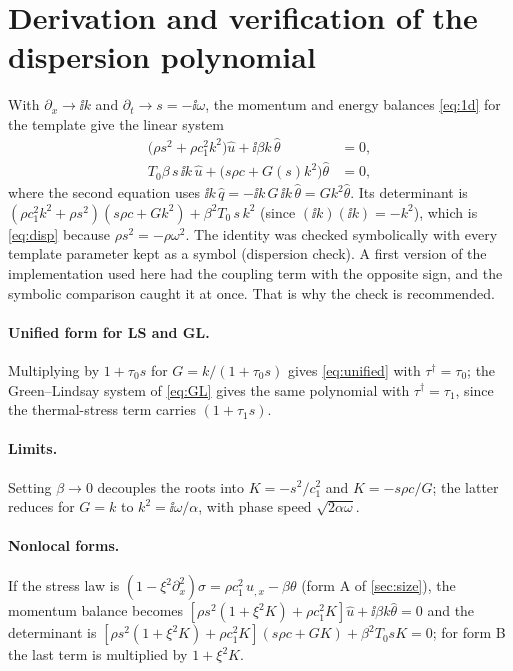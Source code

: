 \section{Derivation and verification of the dispersion polynomial}\label{app:disp}
With $\partial_x\to\ii k$ and $\partial_t\to s=-\ii\omega$, the momentum and energy balances \eqref{eq:1d} for the template give the linear system
\begin{align}
\bigl(\rho s^2+\rho c_1^2k^2\bigr)\hat u+\ii\beta k\,\hat\theta&=0,\\
T_0\beta\,s\,\ii k\,\hat u+\bigl(s\rho c+G(s)k^2\bigr)\hat\theta&=0,
\end{align}
where the second equation uses $\ii k\,\hat q=-\ii k\,G\,\ii k\,\hat\theta=Gk^2\hat\theta$. Its determinant is
$(\rho c_1^2k^2+\rho s^2)(s\rho c+Gk^2)+\beta^2T_0\,s\,k^2$ (since $(\ii k)(\ii k)=-k^2$), which is \eqref{eq:disp} because $\rho s^2=-\rho\omega^2$. The identity was checked symbolically with every template parameter kept as a symbol (dispersion check). A first version of the implementation used here had the coupling term with the opposite sign, and the symbolic comparison caught it at once. That is why the check is recommended.

\paragraph{Unified form for LS and GL.} Multiplying by $1+\tau_0s$ for $G=k/(1+\tau_0s)$ gives \eqref{eq:unified} with $\tau^\dagger=\tau_0$; the Green--Lindsay system of \eqref{eq:GL} gives the same polynomial with $\tau^\dagger=\tau_1$, since the thermal-stress term carries $(1+\tau_1s)$.

\paragraph{Limits.} Setting $\beta\to0$ decouples the roots into $K=-s^2/c_1^2$ and $K=-s\rho c/G$; the latter reduces for $G=k$ to $k^2=\ii\omega/\alpha$, with phase speed $\sqrt{2\alpha\omega}$.

\paragraph{Nonlocal forms.} If the stress law is $(1-\xi^2\partial_x^2)\sigma=\rho c_1^2\,u_{,x}-\beta\theta$ (form A of \cref{sec:size}), the momentum balance becomes $[\rho s^2(1+\xi^2K)+\rho c_1^2K]\hat u+\ii\beta k\hat\theta=0$ and the determinant is $[\rho s^2(1+\xi^2K)+\rho c_1^2K](s\rho c+GK)+\beta^2T_0sK=0$; for form B the last term is multiplied by $1+\xi^2K$.
